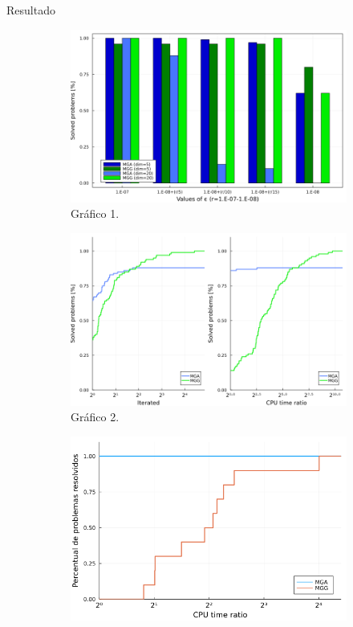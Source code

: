 \begin{trailer}{Resultado}
\begin{figure}[H]
    \centering

    \begin{subfigure}[b]{0.4\textwidth}
        \centering
        \includegraphics[width=\textwidth]{grafico1.png}
        \caption{Gr\'afico 1.}
    \end{subfigure}
    \hfill
    \begin{subfigure}[b]{0.4\textwidth}
        \centering
        \includegraphics[width=\textwidth]{grafico2.png}
        \caption{Gr\'afico 2.}
    \end{subfigure}
        \begin{subfigure}[b]{0.4\textwidth}
        \centering
        \includegraphics[width=\textwidth]{grafico3.png}

\end{subfigure}
\end{figure}
\end{trailer}
